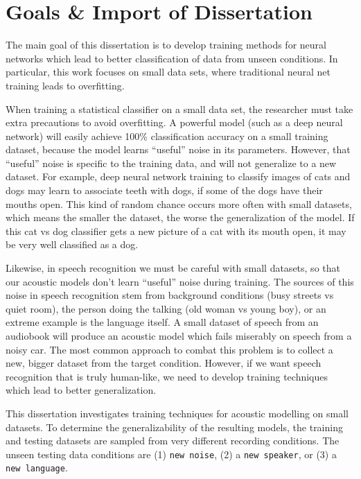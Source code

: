 \documentclass[10pt,a4paper]{article}
\begin{document}
\section{Goals \& Import of Dissertation}

The main goal of this dissertation is to develop training methods for neural networks which lead to better classification of data from unseen conditions. In particular, this work focuses on small data sets, where traditional neural net training leads to overfitting.

When training a statistical classifier on a small data set, the researcher must take extra precautions to avoid overfitting. A powerful model (such as a deep neural network) will easily achieve 100\% classification accuracy on a small training dataset, because the model learns ``useful'' noise in its parameters. However, that ``useful'' noise is specific to the training data, and will not generalize to a new dataset. For example, deep neural network training to classify images of cats and dogs may learn to associate teeth with dogs, if some of the dogs have their mouths open. This kind of random chance occurs more often with small datasets, which means the smaller the dataset, the worse the generalization of the model. If this cat vs dog classifier gets a new picture of a cat with its mouth open, it may be very well classified as a dog.

Likewise, in speech recognition we must be careful with small datasets, so that our acoustic models don't learn ``useful'' noise during training. The sources of this noise in speech recognition stem from background conditions (busy streets vs quiet room), the person doing the talking (old woman vs young boy), or an extreme example is the language itself. A small dataset of speech from an audiobook will produce an acoustic model which fails miserably on speech from a noisy car. The most common approach to combat this problem is to collect a new, bigger dataset from the target condition. However, if we want speech recognition that is truly human-like, we need to develop training techniques which lead to better generalization.

This dissertation investigates training techniques for acoustic modelling on small datasets. To determine the generalizability of the resulting models, the training and testing datasets are sampled from very different recording conditions. The unseen testing data conditions are (1) \texttt{new noise}, (2) a \texttt{new speaker}, or (3) a \texttt{new language}.
\end{document}
